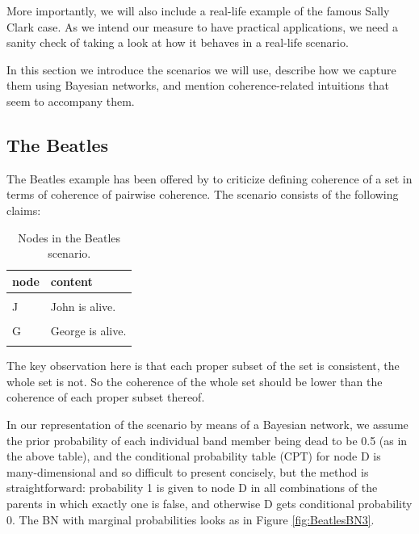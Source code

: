 \documentclass[10pt,]{scrartcl}
\begin{document}
More importantly, we will also include a real-life example of the famous Sally Clark case. As we intend our measure to have practical applications, we need a sanity check of taking a look at how it behaves in a real-life scenario. 

 In this section we introduce the scenarios we will use, describe how we capture them using Bayesian networks, and mention coherence-related intuitions that seem to accompany them. 







\subsection{The Beatles}

 The Beatles example has been offered by \citet[339]{shogenji1999conducive} to criticize defining coherence of a set in terms of 
coherence of pairwise coherence.   The scenario consists of the following claims:

\begin{table}[H]
\centering
\begin{tabular}{ll}
\toprule
node & content\\
\midrule
\cellcolor{gray!6}{D} & \cellcolor{gray!6}{Exactly one of the Beatles (John, Paul, George and Ringo) is dead.}\\
J & John is alive.\\
\cellcolor{gray!6}{P} & \cellcolor{gray!6}{Paul is alive.}\\
G & George is alive.\\
\cellcolor{gray!6}{R} & \cellcolor{gray!6}{Ringo is alive.}\\
\bottomrule
\end{tabular}
\caption{Nodes in the Beatles scenario.}
\label{tab:beatles}
\end{table}

The key observation here is that each proper subset of the set is consistent, the whole set is not. So the coherence of the whole set should be lower than the coherence of each proper subset thereof.

In our representation of the scenario by means of a Bayesian network,  we assume the prior probability of each individual band member being
dead to be 0.5 (as in the above table), and the conditional probability table (CPT) for node \textsf{D} is
many-dimensional and so difficult to present concisely, but the method
is straightforward: probability 1 is given to node \textsf{D} in all
combinations of the parents in which exactly one is false, and otherwise
\textsf{D} gets conditional probability 0. The BN with marginal probabilities looks as in Figure \ref{fig:BeatlesBN3}.
\end{document}
